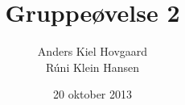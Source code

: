 \documentclass[12pt,a4paper,danish]{article}
\begin{document}
\title{Gruppeøvelse 2}
\author{Anders Kiel Hovgaard\\Rúni Klein Hansen}
\date{20 oktober 2013}
\maketitle
\end{document}
